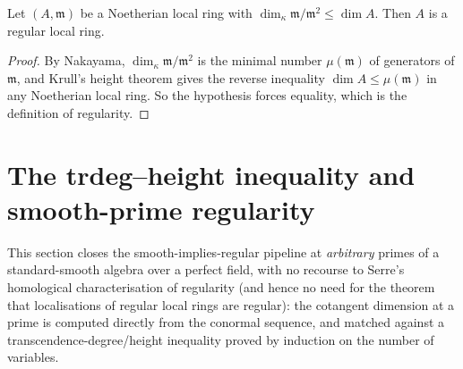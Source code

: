 \begin{lemma}
  \label{pa-lem:regular_of_cotangent_le_dim}
  \leanok

  Let \((A, \mathfrak m)\) be a Noetherian local ring with
  \(\dim_\kappa \mathfrak m/\mathfrak m^2 \leq \dim A\). Then \(A\) is a regular local
  ring.
\end{lemma}
\begin{proof}
  \leanok
  By Nakayama, \(\dim_\kappa \mathfrak m/\mathfrak m^2\) is the minimal number
  \(\mu(\mathfrak m)\) of generators of \(\mathfrak m\), and Krull's height theorem
  gives the reverse inequality \(\dim A \leq \mu(\mathfrak m)\) in any Noetherian local
  ring. So the hypothesis forces equality, which is the definition of regularity.
\end{proof}

\section{The trdeg--height inequality and smooth-prime regularity}
\label{pa-sec:smooth_prime_regularity}

This section closes the smooth-implies-regular pipeline at \emph{arbitrary} primes of a
standard-smooth algebra over a perfect field, with no recourse to Serre's homological
characterisation of regularity (and hence no need for the theorem that localisations of
regular local rings are regular): the cotangent dimension at a prime is computed
directly from the conormal sequence, and matched against a transcendence-degree/height
inequality proved by induction on the number of variables.

